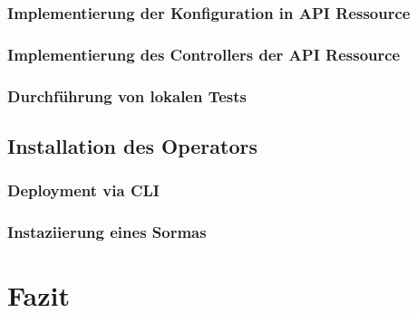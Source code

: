 \documentclass[a4paper,11pt]{article}
\begin{document}
      \subsubsection{Implementierung der Konfiguration in API Ressource}
      \subsubsection{Implementierung des Controllers der API Ressource}
      \subsubsection{Durchführung von lokalen Tests}
    \subsection{Installation des Operators}
      \subsubsection{Deployment via CLI}
      \subsubsection{Instaziierung eines Sormas}
  \section{Fazit}
\end{document}
